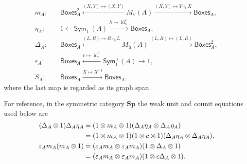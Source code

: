 \documentclass[oneside]{article}
\newcommand{\Boxes}{\mathsf{Boxes}}
\newcommand{\Sym}{\mathsf{Sym}}
\newcommand{\Sp}{\mathbf{Sp}}
\newcommand{\id}{\operatorname{id}}
\theoremstyle{plain}
\theoremstyle{definition}
\theoremstyle{remark}
\begin{document}
\begin{equation}
\begin{aligned}
m_A:\quad&
 \Boxes_A^2
 \xleftarrow{(X,Y)\mapsto(X,Y)}M_{\mathrm v}(A)
 \xrightarrow{(X,Y)\mapsto Y\circ_{\mathrm v}X}\Boxes_A,\\[.8em]
\eta_A:\quad&
 1\longleftarrow\Sym^-_1(A)
 \xrightarrow{h\mapsto\id_h^{\mathrm v}}\Boxes_A,\\[.8em]
\Delta_A:\quad&
 \Boxes_A
 \xleftarrow{(L,R)\mapsto R\circ_{\mathrm h}L}M_{\mathrm h}(A)
 \xrightarrow{(L,R)\mapsto(L,R)}\Boxes_A^2,\\[.8em]
\varepsilon_A:\quad&
 \Boxes_A\xleftarrow{v\mapsto\id_v^{\mathrm h}}
 \Sym^+_1(A)\longrightarrow1,\\[.8em]
S_A:\quad&
 \Boxes_A\xrightarrow{X\mapsto X^{-1}}\Boxes_A.
\end{aligned}
\label{eq:cgqg-game-wh-structure-maps}
\end{equation}
where the last map is regarded as its graph span.

For reference, in the symmetric category \(\Sp\) the weak unit and counit equations used below are
\begin{align}
    (\Delta_A\otimes1)\Delta_A\eta_A
    &=(1\otimes m_A\otimes1)(\Delta_A\eta_A\otimes\Delta_A\eta_A)
    \notag\\
    &=(1\otimes m_A\otimes1)(1\otimes c\otimes1)(\Delta_A\eta_A\otimes\Delta_A\eta_A),
    \label{eq:cgqg-game-weak-unit-equations}\\
    \varepsilon_A m_A(m_A\otimes1)
    &=(\varepsilon_A m_A\otimes\varepsilon_A m_A)(1\otimes\Delta_A\otimes1)
    \notag\\
    &=(\varepsilon_A m_A\otimes\varepsilon_A m_A)(1\otimes c\Delta_A\otimes1).
    \label{eq:cgqg-game-weak-counit-equations}
\end{align}
\end{document}
